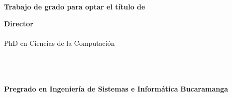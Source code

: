 \begin{titlepage}
	\begin{center}

		\textbf{\tit}

		\vspace{6em}

		\nam
		\skipline
		\namB

		\vspace{6em}

		\textbf{Trabajo de grado para optar el título de \opta}

		\vspace{6em}

		\textbf{Director}\\
		\dir\\  PhD en Ciencias de la Computación

		\vspace{3em}


		\vspace{4em}

		\textbf{\uni} \\
		\textbf{\fac} \\
		\textbf{\esc} \\
		\textbf{Pregrado en Ingeniería de Sistemas e Informática}
		\textbf{Bucaramanga} \\
		\textbf{\the\year}


	\end{center}
\end{titlepage}

